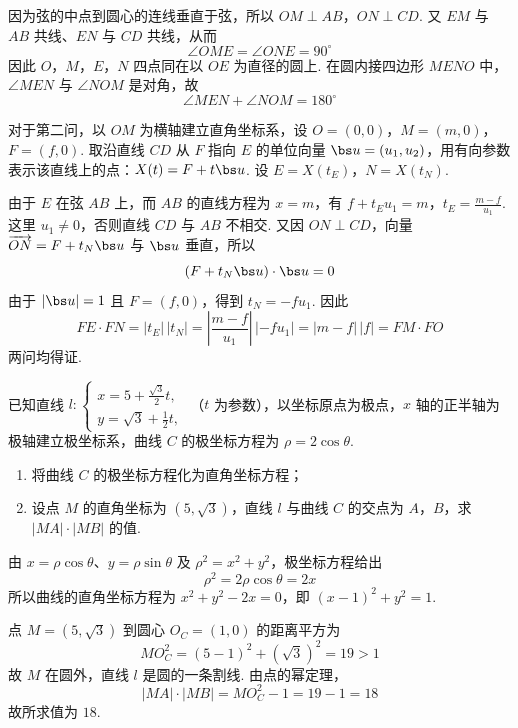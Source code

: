 \begin{solution}
因为弦的中点到圆心的连线垂直于弦，所以 \(OM\perp AB\)，\(ON\perp CD\). 又 \(EM\) 与 \(AB\) 共线、\(EN\) 与 \(CD\) 共线，从而
\[
\angle OME=\angle ONE=90^\circ
\]
因此 \(O\)，\(M\)，\(E\)，\(N\) 四点同在以 \(OE\) 为直径的圆上. 在圆内接四边形 \(MENO\) 中，\(\angle MEN\) 与 \(\angle NOM\) 是对角，故
\[
\angle MEN+\angle NOM=180^\circ
\]

对于第二问，以 \(OM\) 为横轴建立直角坐标系，设 \(O=(0,0)\)，\(M=(m,0)\)，\(F=(f,0)\). 取沿直线 \(CD\) 从 \(F\) 指向 \(E\) 的单位向量 \(\bs u=(u_1,u_2)\)，用有向参数表示该直线上的点：\(X(t)=F+t\bs u\). 设 \(E=X(t_E)\)，\(N=X(t_N)\).

由于 \(E\) 在弦 \(AB\) 上，而 \(AB\) 的直线方程为 \(x=m\)，有
\(f+t_Eu_1=m\)，\(t_E=\frac{m-f}{u_1}\).
这里 \(u_1\neq0\)，否则直线 \(CD\) 与 \(AB\) 不相交. 又因 \(ON\perp CD\)，向量 \(\overrightarrow{ON}=F+t_N\bs u\) 与 \(\bs u\) 垂直，所以
\[
(F+t_N\bs u)\cdot\bs u=0
\]
由于 \(\lvert\bs u\rvert=1\) 且 \(F=(f,0)\)，得到 \(t_N=-fu_1\). 因此
\[
FE\cdot FN=|t_E|\,|t_N|=\left|\frac{m-f}{u_1}\right|\,|-fu_1|=|m-f|\,|f|=FM\cdot FO
\]
两问均得证.
\end{solution}

\reuseproblemnumber
\begin{problem}[II]
已知直线 \(l: \begin{cases}
x = 5 + \frac{\sqrt{3}}{2} t,\\
y = \sqrt{3} + \frac{1}{2} t,
\end{cases}\) （\(t\) 为参数），以坐标原点为极点，\(x\) 轴的正半轴为极轴建立极坐标系，曲线 \(C\) 的极坐标方程为 \(\rho = 2\cos \theta\).

\begin{enumerate}
\item 将曲线 \(C\) 的极坐标方程化为直角坐标方程；
\item 设点 \(M\) 的直角坐标为 \((5, \sqrt{3})\)，直线 \(l\) 与曲线 \(C\) 的交点为 \(A\)，\(B\)，求 \( |MA|\cdot|MB| \) 的值.
\end{enumerate}
\end{problem}

\begin{solution}
由 \(x=\rho\cos\theta\)、\(y=\rho\sin\theta\) 及 \(\rho^2=x^2+y^2\)，极坐标方程给出
\[
\rho^2=2\rho\cos\theta=2x
\]
所以曲线的直角坐标方程为 \(x^2+y^2-2x=0\)，即 \((x-1)^2+y^2=1\).

点 \(M=(5,\sqrt3)\) 到圆心 \(O_C=(1,0)\) 的距离平方为
\[
MO_C^2=(5-1)^2+(\sqrt3)^2=19>1
\]
故 \(M\) 在圆外，直线 \(l\) 是圆的一条割线. 由点的幂定理，
\[
|MA|\cdot|MB|=MO_C^2-1=19-1=18
\]
故所求值为 \(18\).
\end{solution}

